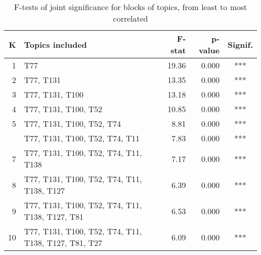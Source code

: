 \begin{table}[!h]
\centering
\caption{\label{tab:tab:joint_signif}F-tests of joint significance for blocks of topics, from least to most correlated}
\centering
\begin{tabular}[t]{rlrrc}
\toprule
K & Topics included & F-stat & p-value & Signif.\\
\midrule
1 & T77 & 19.36 & 0.000 & ***\\
2 & T77, T131 & 13.35 & 0.000 & ***\\
3 & T77, T131, T100 & 13.18 & 0.000 & ***\\
4 & T77, T131, T100, T52 & 10.85 & 0.000 & ***\\
5 & T77, T131, T100, T52, T74 & 8.81 & 0.000 & ***\\
\addlinespace
6 & T77, T131, T100, T52, T74, T11 & 7.83 & 0.000 & ***\\
7 & T77, T131, T100, T52, T74, T11, T138 & 7.17 & 0.000 & ***\\
8 & T77, T131, T100, T52, T74, T11, T138, T127 & 6.39 & 0.000 & ***\\
9 & T77, T131, T100, T52, T74, T11, T138, T127, T81 & 6.53 & 0.000 & ***\\
10 & T77, T131, T100, T52, T74, T11, T138, T127, T81, T27 & 6.09 & 0.000 & ***\\
\bottomrule
\end{tabular}
\end{table}
